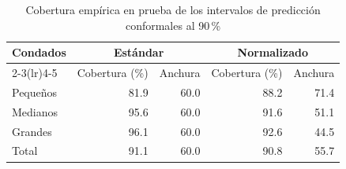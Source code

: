 \begin{table}[htbp]
\centering
\small
\caption{Cobertura empírica en prueba de los intervalos de predicción conformales al \num{90}\,\%}\label{tab:conformal}
\begin{tabular}{l r r r r}
\toprule
Condados & \multicolumn{2}{c}{Estándar} & \multicolumn{2}{c}{Normalizado} \\ \cmidrule(lr){2-3}\cmidrule(lr){4-5} & Cobertura (\%) & Anchura & Cobertura (\%) & Anchura \\
\midrule
Pequeños & \num{81.9} & \num{60.0} & \num{88.2} & \num{71.4} \\
Medianos & \num{95.6} & \num{60.0} & \num{91.6} & \num{51.1} \\
Grandes & \num{96.1} & \num{60.0} & \num{92.6} & \num{44.5} \\
\midrule
Total & \num{91.1} & \num{60.0} & \num{90.8} & \num{55.7} \\
\bottomrule
\end{tabular}

\end{table}
